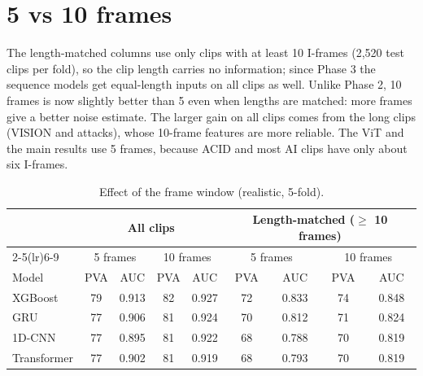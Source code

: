 \documentclass[11pt,a4paper]{article}
\begin{document}
\section{5 vs 10 frames}
The length-matched columns use only clips with at least 10 I-frames (2,520 test clips per fold), so the clip length carries no information; since Phase 3 the sequence models get equal-length inputs on all clips as well. Unlike Phase 2, 10 frames is now slightly better than 5 even when lengths are matched: more frames give a better noise estimate. The larger gain on all clips comes from the long clips (VISION and attacks), whose 10-frame features are more reliable. The ViT and the main results use 5 frames, because ACID and most AI clips have only about six I-frames.
\begin{table}[H]\centering\small\caption{Effect of the frame window (realistic, 5-fold).}\label{tab:window}\begin{tabular}{lcccccccc}\toprule & \multicolumn{4}{c}{All clips} & \multicolumn{4}{c}{Length-matched ($\geq$ 10 frames)} \\\cmidrule(lr){2-5}\cmidrule(lr){6-9} & \multicolumn{2}{c}{5 frames} & \multicolumn{2}{c}{10 frames} & \multicolumn{2}{c}{5 frames} & \multicolumn{2}{c}{10 frames} \\Model & PVA & AUC & PVA & AUC & PVA & AUC & PVA & AUC \\\midrule
XGBoost & 79 & 0.913 & 82 & 0.927 & 72 & 0.833 & 74 & 0.848 \\
GRU & 77 & 0.906 & 81 & 0.924 & 70 & 0.812 & 71 & 0.824 \\
1D-CNN & 77 & 0.895 & 81 & 0.922 & 68 & 0.788 & 70 & 0.819 \\
Transformer & 77 & 0.902 & 81 & 0.919 & 68 & 0.793 & 70 & 0.819 \\
\bottomrule\end{tabular}\end{table}
\end{document}
